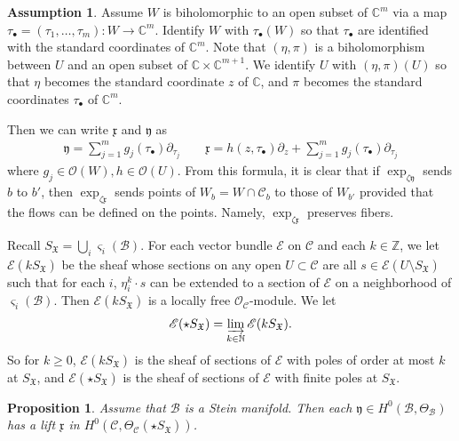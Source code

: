 \documentclass[11pt,b5paper,notitlepage]{article}
\theoremstyle{definition}
\newtheorem{ass}[df]{Assumption}
\theoremstyle{plain}
\newtheorem{pp}[df]{Proposition}
\newcommand{\fk}{\mathfrak}
\newcommand{\mc}{\mathcal}
\newcommand{\scr}{\mathscr}
\newcommand{\xk}{\mathfrak x}
\newcommand{\yk}{\mathfrak y}
\newcommand{\sgm}{\varsigma}
\newcommand{\SX}{{S_{\fk X}}}
\newcommand{\blt}{\bullet}
\newcommand{\Cbb}{\mathbb C}
\newcommand{\Nbb}{\mathbb N}
\newcommand{\Zbb}{\mathbb Z}
\numberwithin{equation}{section}
\begin{document}
\begin{ass}\label{lb113}
Assume $W$ is biholomorphic to an open subset of $\Cbb^m$ via a map $\tau_\blt=(\tau_1,\dots,\tau_m):W\rightarrow\Cbb^m$. Identify $W$ with $\tau_\blt(W)$ so that $\tau_\blt$ are identified with the standard coordinates of $\Cbb^m$. Note that $(\eta,\pi)$ is a biholomorphism between $U$ and an open subset of $\Cbb\times\Cbb^{m+1}$. We identify $U$ with $(\eta,\pi)(U)$ so that $\eta$ becomes the standard coordinate $z$ of $\Cbb$, and $\pi$ becomes the standard coordinates $\tau_\blt$ of $\Cbb^m$.
\end{ass}

Then we can write $\xk$ and $\yk$ as
\begin{subequations}
\begin{gather}
\yk=\sum_{j=1}^m g_j(\tau_\blt)\partial_{\tau_j}\qquad \xk=h(z,\tau_\blt)\partial_z+\sum_{j=1}^m g_j(\tau_\blt)\partial_{\tau_j}
\end{gather}
\end{subequations}
where $g_j\in\scr O(W),h\in\scr O(U)$. From this formula, it is clear that if $\exp_{\zeta\yk}$ sends $b$ to $b'$, then $\exp_{\zeta\xk}$ sends points of $W_b=W\cap\mc C_b$ to those of $W_{b'}$ provided that the flows can be defined on the points. Namely, $\exp_{\zeta\xk}$ preserves fibers.




Recall $\SX=\bigcup_i\sgm_i(\mc B)$. For each vector bundle $\scr E$ on $\mc C$ and each $k\in\Zbb$, we let $\scr E(k\SX)$ \index{ESX@$\scr E(k\SX),\scr E(\star\SX)$} be the sheaf whose sections on any open $U\subset\mc C$ are all $s\in\mc E(U\setminus\SX)$ such that for each $i$, $\eta_i^k\cdot s$ can be extended to a section of $\scr E$ on a neighborhood of $\sgm_i(\mc B)$. Then $\scr E(k\SX)$ is a locally free $\scr O_{\mc C}$-module. We let
\begin{align*}
\scr E(\star\SX)=\varinjlim_{k\in\Nbb}\scr E(k\SX).
\end{align*}
So for $k\geq0$, $\scr E(k\SX)$ is the sheaf of sections of $\scr E$ with poles of order at most $k$ at $\SX$, and  $\scr E(\star\SX)$ is the sheaf of sections of $\scr E$ with finite poles at $\SX$.




\begin{pp}\label{lb114}
Assume that $\mc B$ is a Stein manifold. Then each $\yk\in H^0(\mc B,\Theta_{\mc B})$ has a lift $\xk$ in $H^0(\mc C,\Theta_{\mc C}(\star\SX))$. 
\end{pp}
\end{document}
